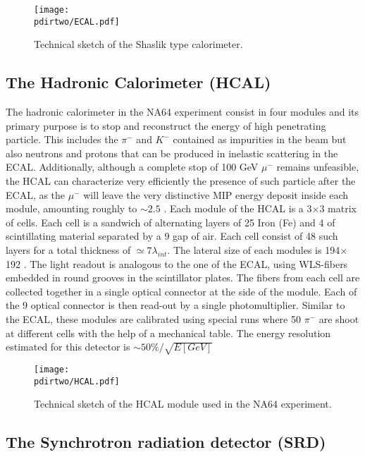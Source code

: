 \begin{figure}[bth!]
  \centering
  \texttt{[image: \\pdirtwo/ECAL.pdf]}
  \caption[ECAL sketch]{Technical sketch of the Shaslik type calorimeter.}
  \label{fig:ecal-sketch}
\end{figure}

\subsection{The Hadronic Calorimeter (HCAL)}
\label{chapter2:sec:detectors-hcal}

The hadronic calorimeter in the NA64 experiment consist in four modules and its primary purpose is to stop and reconstruct the energy of high penetrating particle. This includes the $\pi^-$ and $K^-$ contained as impurities in the beam but also neutrons and protons that can be produced in inelastic scattering in the ECAL. Additionally, although a complete stop of 100 GeV $\mu^-$ remains unfeasible, the HCAL can characterize very efficiently the presence of such particle after the ECAL, as the $\mu^-$ will leave the very distinctive MIP energy deposit inside each module, amounting roughly to $\sim 2.5$ \gev. Each module of the HCAL is a 3$\times$3 matrix of cells. Each cell is a sandwich of alternating layers of 25 \mmi Iron (Fe) and 4 \mmi of scintillating material separated by a 9 \mmi gap  of air. Each cell consist of 48 such layers for a total thickness of $\simeq 7\lambda_{int}$. The lateral size of each modules is 194$\times$192 \mms. The light readout is analogous to the one of the ECAL, using WLS-fibers embedded in round grooves in the scintillator plates. The fibers from each cell are collected together in a single optical connector at the side of the module. Each of the 9 optical connector is then read-out by a single photomultiplier. Similar to the ECAL, these modules are calibrated using special runs where 50 \gev $\pi^-$ are shoot at different cells with the help of a mechanical table. The energy resolution estimated for this detector is $\sim 50\%/\sqrt{E[GeV]}$

\begin{figure}[bth!]
  \centering
  \texttt{[image: \\pdirtwo/HCAL.pdf]}
  \caption[HCAL sketch]{Technical sketch of the HCAL module used in the NA64 experiment.}
  \label{fig:hcal-sketch}
\end{figure}

\subsection{The Synchrotron radiation detector (SRD)}
\label{chapter2:sec:detectors-srd}

